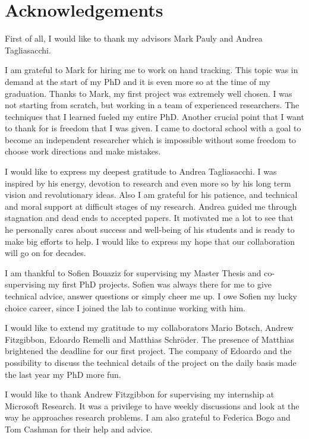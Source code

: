 \chapter*{Acknowledgements}
First of all, I would like to thank my advisors Mark Pauly and Andrea Tagliasacchi.

I am grateful to Mark for hiring me to work on hand tracking. This topic was in demand at the start of my PhD and it is even more so at the time of my graduation. Thanks to Mark, my first project was extremely well chosen. I was not starting from scratch, but working in a team of experienced researchers. The techniques that I learned fueled my entire PhD. Another crucial point that I want to thank for is freedom that I was given. I came to doctoral school with a goal to become an independent researcher which is impossible without some freedom to choose work directions and make mistakes.

I would like to express my deepest gratitude to Andrea Tagliasacchi. I was inspired by his energy, devotion to research and even more so by his long term vision and revolutionary ideas. Also I am grateful for his patience, and technical and moral support at difficult stages of my research. Andrea guided me through stagnation and dead ends to accepted papers. It motivated me a lot to see that he personally cares about success and well-being of his students and is ready to make big efforts to help. I would like to express my hope that our collaboration will go on for decades.

I am thankful to Sofien Bouaziz for supervising my Master Thesis and co-supervising my first PhD projects. Sofien was always there for me to give technical advice, answer questions or simply cheer me up. I owe Sofien my lucky choice career, since I joined the lab to continue working with him.

I would like to extend my gratitude to my collaborators Mario Botsch, Andrew Fitzgibbon, Edoardo Remelli and Matthias Schröder. The presence of Matthias brightened the deadline for our first project. The company of Edoardo and the possibility to discuss the technical details of the project on the daily basis made the last year my PhD more fun.

I would like to thank Andrew Fitzgibbon for supervising my internship at Microsoft Research. It was a privilege to have weekly discussions and look at the way he approaches research problems. I am also grateful to Federica Bogo and Tom Cashman for their help and advice.


